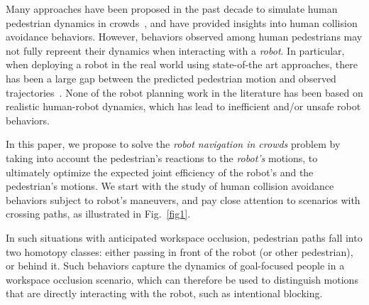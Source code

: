 \documentclass[conference]{IEEEtran}
\begin{document}
Many approaches have been proposed in the 
past decade to simulate human pedestrian dynamics in crowds~\cite{helbing1995,lamarche2004crowd, 
karamouzas2009predictive}, and have provided insights into human collision avoidance behaviors.
However, 
behaviors observed among human pedestrians may not fully 
repreent their dynamics when interacting with a \emph{robot}. 
In particular, when deploying a robot in the real world using state-of-the art approaches, there has been a 
large gap between the predicted pedestrian motion and observed trajectories~\cite{trautman2015robot,pfeiffer2016predicting}. 
None of the robot planning work in the literature has been based on realistic human-robot dynamics,
 which has lead to inefficient and/or unsafe robot behaviors.

In this paper, we propose to solve the \emph{robot navigation 
in crowds} problem by taking into account the pedestrian's reactions to the 
\emph{robot's} motions, to ultimately optimize the expected joint efficiency 
of the robot's and the pedestrian's motions. We start with the study of human 
collision avoidance behaviors subject to robot's maneuvers, and pay close 
attention to scenarios with crossing paths, as illustrated in Fig.~\ref{fig1}.

In such situations with anticipated workspace occlusion,
pedestrian paths fall into two homotopy classes: either passing in front of the 
robot (or other pedestrian), or behind it. Such behaviors capture the dynamics of 
goal-focused people in a workspace occlusion scenario, which can therefore 
be used to distinguish motions that are directly interacting with the robot, such as 
intentional blocking.




\end{document}
